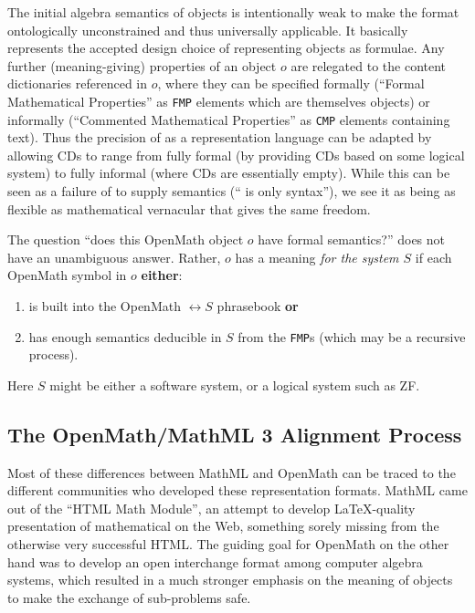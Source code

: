 \documentclass{llncs}
\begin{document}
The initial algebra semantics of {\openmath} objects is intentionally weak to make the
{\openmath} format ontologically unconstrained and thus universally applicable. It
basically represents the accepted design choice of representing objects as formulae. Any
further (meaning-giving) properties of an object $o$ are relegated to the content
dictionaries referenced in $o$, where they can be specified formally (``Formal
Mathematical Properties'' as {\texttt{FMP}} elements which are themselves {\openmath} objects) or
informally (``Commented Mathematical Properties'' as {\texttt{CMP}} elements containing
text). Thus the precision of {\openmath} as a representation language can be adapted by
allowing CDs to range from fully formal (by providing CDs based on some logical system)
to fully informal (where CDs are essentially empty). While this can be seen as a failure
of {\openmath} to supply semantics (``{\openmath} is only syntax''), we see it as being as
flexible as mathematical vernacular that gives the same freedom.

The question ``does this OpenMath object $o$ have formal semantics?'' does not have an unambiguous answer. Rather, $o$ has a meaning {\em for the system $S$\/} if each OpenMath symbol in $o$ {\bf either}:
\begin{enumerate}
\item is built into the OpenMath $\leftrightarrow S$ phrasebook {\bf or}
\item has enough semantics deducible in $S$ from the {\texttt{FMP}}s (which
may be a recursive process).
\end{enumerate}
Here $S$ might be either a software system, or a logical system such as ZF.
\subsection{The OpenMath/MathML 3 Alignment Process}\label{sec:alignment}

Most of these differences between MathML and OpenMath can be traced to the different
communities who developed these representation formats. MathML came out of the ``HTML Math
Module'', an attempt to develop {\LaTeX}-quality presentation of mathematical on the Web,
something sorely missing from the otherwise very successful HTML. The guiding goal for OpenMath on
the other hand was to develop an open interchange format among computer algebra systems,
which resulted in a much stronger emphasis on the meaning of objects to make the exchange
of sub-problems safe.
\end{document}
